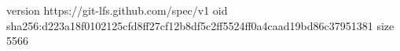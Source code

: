 version https://git-lfs.github.com/spec/v1
oid sha256:d223a18f0102125cfd8ff27cf12b8df5c2ff5524ff0a4caad19bd86c37951381
size 5566
